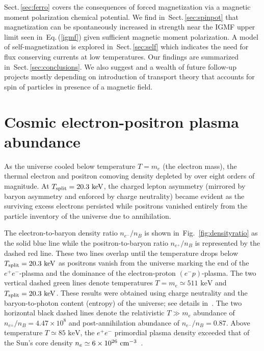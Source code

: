 \documentclass[aps,prd,floatfix,reprint]{revtex4-2}
\newcommand*{\keV}{\text{ keV}}
\newcommand{\req}[1]{Eq.\,(\ref{#1})}
\newcommand{\rf}[1]{Fig.~{\ref{#1}}}
\newcommand{\rsec}[1]{Sect.\,{\ref{#1}}}
\begin{document}
\rsec{sec:ferro} covers the consequences of forced magnetization via a magnetic moment polarization chemical potential. We find in~\rsec{sec:spinpot} that magnetization can be spontaneously increased in strength near the IGMF upper limit seen in~\req{igmf} given sufficient magnetic moment polarization. A model of self-magnetization is explored in~\rsec{sec:self} which indicates the need for flux conserving currents at low temperatures. Our findings are summarized in~\rsec{sec:conclusions}. We also suggest and a wealth of future follow-up projects mostly depending on introduction of transport theory that accounts for spin of particles in presence of a magnetic field.

\section{Cosmic electron-positron plasma abundance}
\label{sec:abundance}
\noindent As the universe cooled below temperature $T=m_{e}$ (the electron mass), the thermal electron and positron comoving density depleted by over eight orders of magnitude. At $T_{\rm split}=20.3\keV$, the charged lepton asymmetry (mirrored by baryon asymmetry and enforced by charge neutrality) became evident as the surviving excess electrons persisted while positrons vanished entirely from the particle inventory of the universe due to annihilation.

The electron-to-baryon density ratio $n_{e^{-}}/n_{B}$ is shown in~\rf{fig:densityratio} as the solid blue line while the positron-to-baryon ratio $n_{e^{+}}/n_{B}$ is represented by the dashed red line. These two lines overlap until the temperature drops below $T_{\rm split}=20.3\keV$ as positrons vanish from the universe marking the end of the $e^{+}e^{-}$-plasma and the dominance of the electron-proton $(e^{-}p)$-plasma. The two vertical dashed green lines denote temperatures $T=m_{e}\simeq511\keV$ and $T_{\rm split}=20.3\keV$. These results were obtained using charge neutrality and the baryon-to-photon content (entropy) of the universe; see details in~\cite{Rafelski:2023emw}. The two horizontal black dashed lines denote the relativistic $T\gg m_e$ abundance of $n_{e^{\pm}}/n_{B}=4.47\times10^{8}$ and post-annihilation abundance of $n_{e^{-}}/n_{B}=0.87$. Above temperature $T\simeq85\keV$, the $e^{+}e^{-}$ primordial plasma density exceeded that of the Sun's core density $n_{e}\simeq6\times10^{26}{\rm\ cm}^{-3}$~\cite{Bahcall:2000nu}. 
\end{document}
